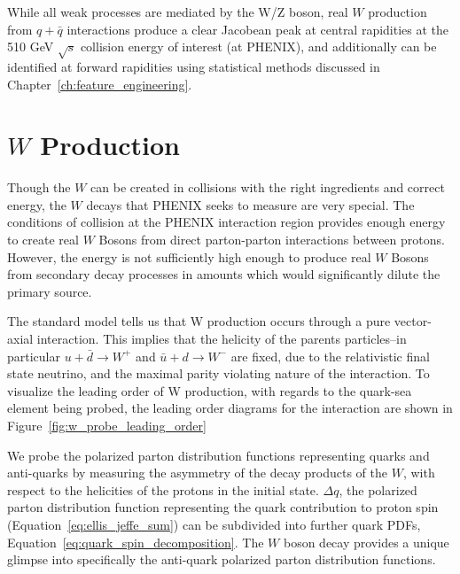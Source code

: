 While all weak processes are mediated by the W/Z boson, real $W$ production from
$q+\bar{q}$ interactions produce a clear Jacobean peak at central rapidities at
the 510 GeV $\sqrt{s}$ collision energy of interest (at PHENIX), and
additionally can be identified at forward rapidities using statistical methods
discussed in Chapter~\ref{ch:feature_engineering}.

\clearpage
\section{$W$ Production}

Though the $W$ can be created in collisions with the right ingredients and
correct energy, the $W$ decays that PHENIX seeks to measure are very special.
The conditions of collision at the PHENIX interaction region provides enough
energy to create real $W$ Bosons from direct parton-parton interactions between
protons. However, the energy is not sufficiently high enough to produce real $W$
Bosons from secondary decay processes in amounts which would significantly
dilute the primary source.

The standard model tells us that W production occurs through a pure vector-axial
interaction. This implies that the helicity of the parents particles--in
particular $u+\bar{d}\rightarrow W^+$ and $\bar{u}+d\rightarrow W^-$ are fixed,
due to the relativistic final state neutrino, and the maximal parity violating
nature of the interaction. To visualize the leading order of W production, with
regards to the quark-sea element being probed, the leading order diagrams for
the interaction are shown in
Figure~\ref{fig:w_probe_leading_order}~\cite{Aidala2005}

We probe the polarized parton distribution functions representing quarks and
anti-quarks by measuring the asymmetry of the decay products of the $W$,
with respect to the helicities of the protons in the initial state. $\Delta q$,
the polarized parton distribution function representing the quark contribution
to proton spin (Equation~\ref{eq:ellis_jeffe_sum}) can be subdivided into
further quark PDFs, Equation~\ref{eq:quark_spin_decomposition}. The $W$ boson
decay provides a unique glimpse into specifically the anti-quark polarized
parton distribution functions.

